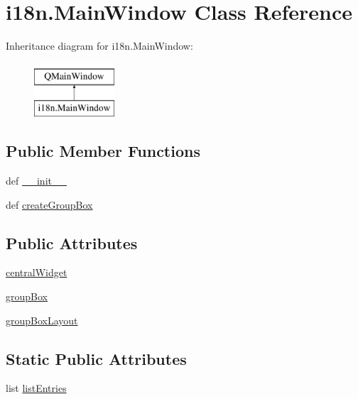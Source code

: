 \hypertarget{classi18n_1_1MainWindow}{}\section{i18n.\+Main\+Window Class Reference}
\label{classi18n_1_1MainWindow}
Inheritance diagram for i18n.\+Main\+Window\+:\begin{figure}[H]
\begin{center}
\leavevmode
\includegraphics[height=2.000000cm]{classi18n_1_1MainWindow}
\end{center}
\end{figure}
\subsection*{Public Member Functions}
\begin{DoxyCompactItemize}
\item 
def \hyperlink{classi18n_1_1MainWindow_affdf9188a1385b3d5d403c941e4da471}{\+\_\+\+\_\+init\+\_\+\+\_\+}
\item 
def \hyperlink{classi18n_1_1MainWindow_a3d4ee8868f48e5811472d77a94b58ae6}{create\+Group\+Box}
\end{DoxyCompactItemize}
\subsection*{Public Attributes}
\begin{DoxyCompactItemize}
\item 
\hyperlink{classi18n_1_1MainWindow_abdfbfc4cd874db3bdfeb4363a4a75692}{central\+Widget}
\item 
\hyperlink{classi18n_1_1MainWindow_ae800ef7cd871621074e3b75570408ced}{group\+Box}
\item 
\hyperlink{classi18n_1_1MainWindow_a3773830930a2f2064038bd7217eaa6be}{group\+Box\+Layout}
\end{DoxyCompactItemize}
\subsection*{Static Public Attributes}
\begin{DoxyCompactItemize}
\item 
list \hyperlink{classi18n_1_1MainWindow_aada35d8247c61549974e696109fb1545}{list\+Entries}
\end{DoxyCompactItemize}


